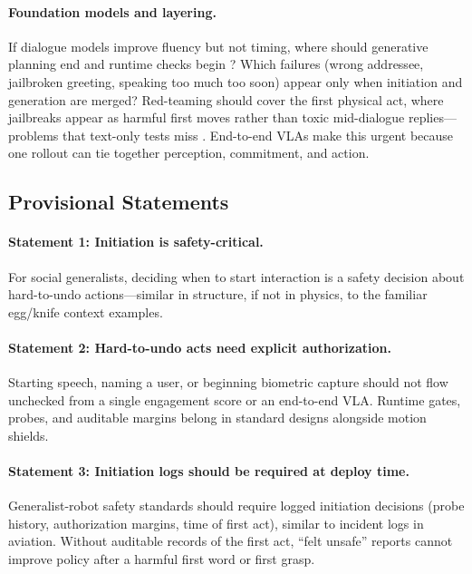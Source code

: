 \paragraph{Foundation models and layering.} If dialogue models improve
fluency but not timing, where should generative planning end and
runtime checks begin \citep{ravichandran2025roboguard}? Which failures
(wrong addressee, jailbroken greeting, speaking too much too soon)
appear only when initiation and generation are merged? Red-teaming
should cover the first physical act, where jailbreaks appear as harmful
first moves rather than toxic mid-dialogue replies---problems that
text-only tests miss \citep{robey2024jailbreaking}. End-to-end VLAs
\citep{openvla-2024} make this urgent because one rollout can tie
together perception, commitment, and action.

\subsection{Provisional Statements}

\paragraph{Statement 1: Initiation is safety-critical.} For social
generalists, deciding when to start interaction is a safety decision
about hard-to-undo actions---similar in structure, if not in physics,
to the familiar egg/knife context examples.

\paragraph{Statement 2: Hard-to-undo acts need explicit
authorization.} Starting speech, naming a user, or beginning
biometric capture should not flow unchecked from a single engagement
score or an end-to-end VLA. Runtime gates, probes, and auditable
margins belong in standard designs alongside motion shields.

\paragraph{Statement 3: Initiation logs should be required at
deploy time.} Generalist-robot safety standards should require logged
initiation decisions (probe history, authorization margins, time of
first act), similar to incident logs in aviation. Without auditable
records of the first act, ``felt unsafe'' reports cannot improve policy
after a harmful first word or first grasp.
